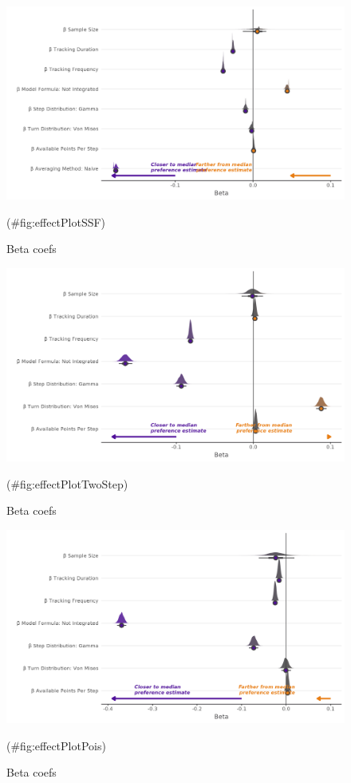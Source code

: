 \documentclass[10pt,a4paper]{article}
\begin{document}
\begin{figure}
\includegraphics[width=1\linewidth]{../figures/ssfBrms_effectsPlot} \caption{Beta coefs}(\#fig:effectPlotSSF)
\end{figure}

\begin{figure}
\includegraphics[width=1\linewidth]{../figures/twoStepBrms_effectsPlot} \caption{Beta coefs}(\#fig:effectPlotTwoStep)
\end{figure}

\begin{figure}
\includegraphics[width=1\linewidth]{../figures/poisBrms_effectsPlot} \caption{Beta coefs}(\#fig:effectPlotPois)
\end{figure}
\end{document}
